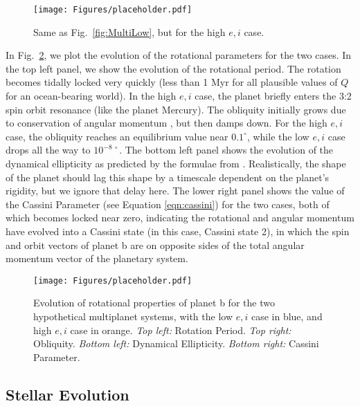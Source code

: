 \documentclass[preprint,12pt]{aastex}
\begin{document}
\begin{figure} 
\begin{center}
\texttt{[image: Figures/placeholder.pdf]}
\end{center}
\caption{Same as Fig.~\ref{fig:MultiLow}, but for the high $e,i$ case.}
\label{fig:MultiHigh}
\end{figure}

In Fig.~\ref{fig:MultiSpins}, we plot the evolution of the rotational
parameters for the two cases. In the top left panel, we show the
evolution of the rotational period. The rotation becomes tidally
locked very quickly (less than 1 Myr for all plausible values of $Q$
for an ocean-bearing world).  In the high $e,i$ case, the planet
briefly enters the 3:2 spin orbit resonance (like the planet Mercury).
The obliquity initially grows due to conservation of angular momentum
\citep{Correia08}, but then damps down. For the high $e,i$ case, the
obliquity reaches an equilibrium value near $0.1^\circ$, while the low
$e,i$ case drops all the way to $10^{-8~\circ}$. The bottom left panel
shows the evolution of the dynamical ellipticity as predicted by the
formulae from \cite{Atobe2007}.  Realistically, the shape of the
planet should lag this shape by a timescale dependent on the planet's
rigidity, but we ignore that delay here. The lower right panel shows the
value of the Cassini Parameter (see Equation \ref{eqn:cassini}) for
the two cases, both of which becomes locked near zero, indicating the
rotational and angular momentum have evolved into a Cassini state (in
this case, Cassini state 2), in which the spin and orbit vectors
of planet b are on opposite sides of the total angular momentum vector
of the planetary system.

\begin{figure} 
\begin{center}
\texttt{[image: Figures/placeholder.pdf]}
\end{center}
\caption{Evolution of rotational properties of planet b for the
 two hypothetical multiplanet systems, with the low $e,i$ case 
 in blue, and high $e,i$ case in orange. {\it Top left:} Rotation
 Period. {\it Top right:} Obliquity. {\it Bottom left:} Dynamical
 Ellipticity. {\it Bottom right:} Cassini Parameter.}
\label{fig:MultiSpins}
\end{figure}

\subsection{Stellar Evolution}
\label{sec:results:stellar}
\end{document}
